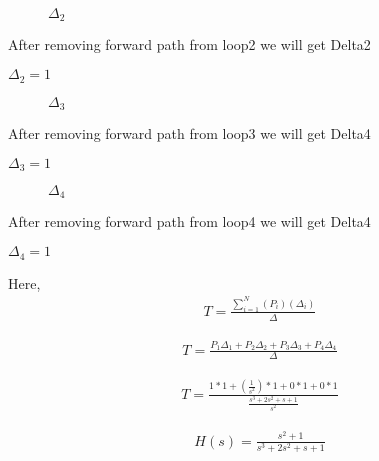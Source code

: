 \begin{enumerate}[label=\thesection.\arabic*.,ref=\thesection.\theenumi]
\begin{figure}[!ht]
\begin{center}
		\resizebox{\columnwidth}{!}{}
	\end{center}
\caption{$\Delta_2$}
\label{fig:sec_order}
\end{figure}

After removing forward path from loop2 we will get Delta2

$\Delta_2 = 1$

\begin{figure}[!ht]
\begin{center}
		
		\resizebox{\columnwidth}{!}{}
	\end{center}
\caption{$\Delta_3$}
\label{fig:sec_order}
\end{figure}

After removing forward path from loop3 we will get Delta4

$\Delta_3 = 1$

\begin{figure}[!ht]
\begin{center}
		
		\resizebox{\columnwidth}{!}{}
	\end{center}
\caption{$\Delta_4$}
\label{fig:sec_order}
\end{figure}

After removing forward path from loop4 we will get Delta4

$\Delta_4 = 1$

Here, 
\begin{align}
T=\frac{\sum_{i=1}^{N}(P_i)(\Delta_i)}{\Delta}
\end{align}

\begin{align}
T=\frac{P_1 \Delta_1+P_2 \Delta_2+P_3 \Delta_3+P_4 \Delta_4}{\Delta}
\end{align}

\begin{align}
T=\frac{1*1 +(\frac{1}{s^2})*1 + 0*1 + 0*1 }{\frac{s^3+2s^2+s+1}{s^2}}
\end{align}

\begin{align}
H(s)=\frac{s^2+1}{s^3+2s^2+s+1}
\end{align}
\renewcommand{\thefigure}{\theenumi}

\end{enumerate}